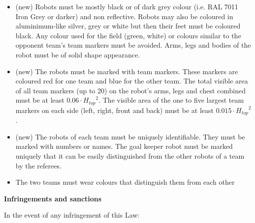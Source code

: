 \begin{itemize}
\item (new) Robots must be mostly black or of dark grey colour (i.e. RAL 7011 Iron Grey or darker) and non reflective. Robots may also be coloured in aluminimum-like silver, grey or white but then their feet must be coloured black. Any colour used for the field (green, white) or colours similar to the opponent team's team markers must be avoided. Arms, legs and bodies of the robot must be of solid shape appearance.
\item (new) The robots must be marked with team markers.
      These markers are coloured red for one team and blue for the other team.
      The total visible area of all team markers (up to 20) on the robot's arms,
      legs and chest combined must be at least $0.06\cdot {H_{top}}^2$.
      The visible area of the one to five largest team markers on each side
      (left, right, front and back) must be at least $0.015\cdot {H_{top}}^2$.
\item (new) The robots of each team must be uniquely identifiable. They must be marked with numbers or names. The goal keeper robot must be marked uniquely that it can be easily distinguished from the other robots of a team by the referees. 
\item The two teams must wear colours that distinguish them from each other 
\end{itemize}

\bigskip

{\bfseries Infringements and sanctions}

\headlinebox


\bigskip

In the event of any infringement of this Law:

